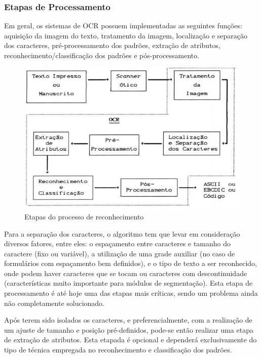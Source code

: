 		\subsubsection{Etapas de Processamento}
		Em geral, os sistemas de OCR possuem implementadas as seguintes funções: aquisição da imagem do texto, tratamento da imagem, localização e separação dos caracteres, pré-processamento dos padrões, extração de atributos, reconhecimento/classificação dos padrões e pós-processamento.
		
		\begin{figure}[!htb]
			\centering
			\includegraphics[scale=0.5]{img/etapas-de-processamento.jpg}
			\caption{Etapas do processo de reconhecimento}
			\label{Etapas do processo de reconhecimento}
		\end{figure}
		
		Para a separação dos caracteres, o algoritmo tem que levar em consideração diversos fatores, entre eles: o espaçamento entre caracteres e tamanho do caractere (fixo ou variável), a utilização de uma grade auxiliar (no caso de formulários com espaçamento bem definidos), e o tipo de texto a ser reconhecido, onde podem haver caracteres que se tocam ou caracteres com descontinuidade (características muito importante para módulos de segmentação). Esta etapa de processamento é até hoje uma das etapas mais críticas, sendo um problema ainda não completamente solucionado.
		
		Após terem sido isolados os caracteres, e preferencialmente, com a realização de um ajuste de tamanho e posição pré-definidos, pode-se então realizar uma etapa de extração de atributos. Esta etapada é opcional e dependerá exclusivamente do tipo de técnica empregada no reconhecimento e classificação dos padrões.
		
